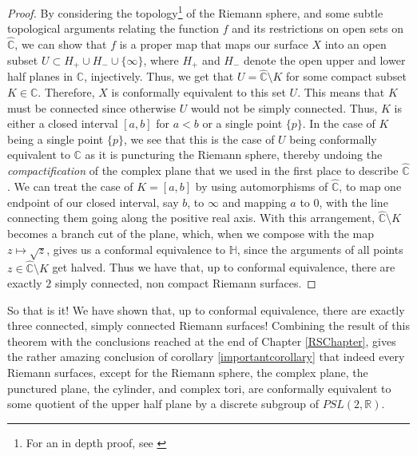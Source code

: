 \documentclass[11pt]{report}
\theoremstyle{definition}
\begin{document}
\begin{proof}
By considering the topology\footnote{For an in depth proof, see \cite[p.132-133]{donaldson}} of the Riemann sphere, and some subtle topological arguments relating the function $f$ and its restrictions on open sets on $\widehat{\mathbb{C}}$, we can show that $f$ is a proper map that maps our surface $X$ into an open subset $U \subset H_+\cup H_- \cup \{\infty\}$, where $H_+$ and $H_-$ denote the open upper and lower half planes in $\mathbb{C}$, injectively. Thus, we get that $U = \widehat{\mathbb{C}}\setminus K$ for some compact subset $K \in \mathbb{C}$. Therefore, $X$ is conformally equivalent to this set $U$. This means that $K$ must be connected since otherwise $U$ would not be simply connected. Thus, $K$ is either a closed interval $[a,b]$ for $a < b$ or a single point $\{p\}$. In the case of $K$ being a single point $\{p\}$, we see that this is the case of $U$ being conformally equivalent to $\mathbb{C}$ as it is puncturing the Riemann sphere, thereby undoing the \emph{compactification} of the complex plane that we used in the first place to describe $\widehat{\mathbb{C}}$. We can treat the case of $K=[a,b]$ by using automorphisms of $\widehat{\mathbb{C}}$, to map one endpoint of our closed interval, say $b$, to $\infty$ and mapping $a$ to $0$, with the line connecting them going along the positive real axis. With this arrangement, $\widehat{\mathbb{C}} \setminus K$ becomes a branch cut of the plane, which, when we compose with the map $z \mapsto \sqrt{z}$, gives us a conformal equivalence to $\mathbb{H}$, since the arguments of all points $z\in \widehat{\mathbb{C}} \setminus K$ get halved. Thus we have that, up to conformal equivalence, there are exactly $2$ simply connected, non compact Riemann surfaces.
\end{proof}

So that is it! We have shown that, up to conformal equivalence, there are exactly three connected, simply connected Riemann surfaces! Combining the result of this theorem with the conclusions reached at the end of Chapter \ref{RSChapter}, gives the rather amazing conclusion of corollary \ref{importantcorollary} that indeed every Riemann surfaces, except for the Riemann sphere, the complex plane, the punctured plane, the cylinder, and complex tori, are conformally equivalent to some quotient of the upper half plane by a discrete subgroup of $PSL(2,\mathbb{R})$.
\end{document}
